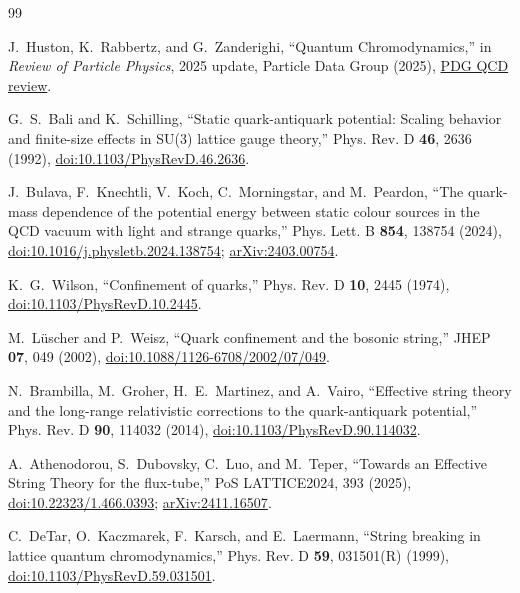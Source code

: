 \documentclass[10pt]{article}
\begin{document}
\begin{thebibliography}{99}

J.~Huston, K.~Rabbertz, and G.~Zanderighi,
``Quantum Chromodynamics,''
in \emph{Review of Particle Physics}, 2025 update,
Particle Data Group (2025),
\href{https://pdg.lbl.gov/2025/reviews/rpp2025-rev-qcd.pdf}{PDG QCD review}.

G.~S.~Bali and K.~Schilling,
``Static quark-antiquark potential: Scaling behavior and finite-size effects in SU(3) lattice gauge theory,''
Phys. Rev. D \textbf{46}, 2636 (1992),
\href{https://doi.org/10.1103/PhysRevD.46.2636}{doi:10.1103/PhysRevD.46.2636}.

J.~Bulava, F.~Knechtli, V.~Koch, C.~Morningstar, and M.~Peardon,
``The quark-mass dependence of the potential energy between static colour sources in the QCD vacuum with light and strange quarks,''
Phys. Lett. B \textbf{854}, 138754 (2024),
\href{https://doi.org/10.1016/j.physletb.2024.138754}{doi:10.1016/j.physletb.2024.138754};
\href{https://arxiv.org/abs/2403.00754}{arXiv:2403.00754}.

K.~G.~Wilson,
``Confinement of quarks,''
Phys. Rev. D \textbf{10}, 2445 (1974),
\href{https://doi.org/10.1103/PhysRevD.10.2445}{doi:10.1103/PhysRevD.10.2445}.

M.~L\"uscher and P.~Weisz,
``Quark confinement and the bosonic string,''
JHEP \textbf{07}, 049 (2002),
\href{https://doi.org/10.1088/1126-6708/2002/07/049}{doi:10.1088/1126-6708/2002/07/049}.

N.~Brambilla, M.~Groher, H.~E.~Martinez, and A.~Vairo,
``Effective string theory and the long-range relativistic corrections to the quark-antiquark potential,''
Phys. Rev. D \textbf{90}, 114032 (2014),
\href{https://doi.org/10.1103/PhysRevD.90.114032}{doi:10.1103/PhysRevD.90.114032}.

A.~Athenodorou, S.~Dubovsky, C.~Luo, and M.~Teper,
``Towards an Effective String Theory for the flux-tube,''
PoS LATTICE2024, 393 (2025),
\href{https://doi.org/10.22323/1.466.0393}{doi:10.22323/1.466.0393};
\href{https://arxiv.org/abs/2411.16507}{arXiv:2411.16507}.

C.~DeTar, O.~Kaczmarek, F.~Karsch, and E.~Laermann,
``String breaking in lattice quantum chromodynamics,''
Phys. Rev. D \textbf{59}, 031501(R) (1999),
\href{https://doi.org/10.1103/PhysRevD.59.031501}{doi:10.1103/PhysRevD.59.031501}.


\end{thebibliography}
\end{document}
